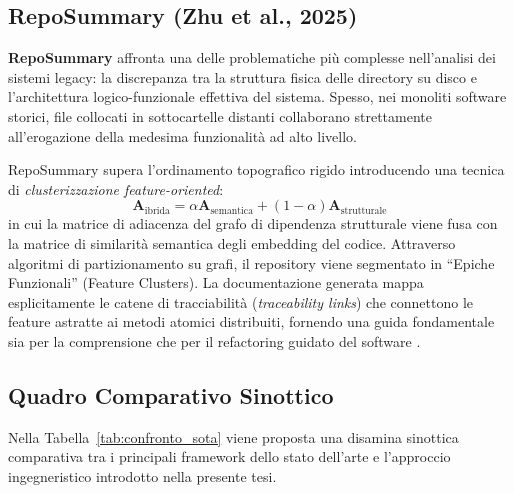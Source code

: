 \subsection{RepoSummary (Zhu et al., 2025)}
\label{subsec:reposummary}
\textbf{RepoSummary} \cite{zhu_reposummary_2025} affronta una delle problematiche più complesse nell'analisi dei sistemi legacy: la discrepanza tra la struttura fisica delle directory su disco e l'architettura logico-funzionale effettiva del sistema. Spesso, nei monoliti software storici, file collocati in sottocartelle distanti collaborano strettamente all'erogazione della medesima funzionalità ad alto livello.

RepoSummary supera l'ordinamento topografico rigido introducendo una tecnica di \emph{clusterizzazione feature-oriented}:
\begin{equation}
    \mathbf{A}_{\mathrm{ibrida}} = \alpha \mathbf{A}_{\mathrm{semantica}} + (1 - \alpha) \mathbf{A}_{\mathrm{strutturale}}
    \label{eq:reposummary_hybrid}
\end{equation}
in cui la matrice di adiacenza del grafo di dipendenza strutturale viene fusa con la matrice di similarità semantica degli embedding del codice. Attraverso algoritmi di partizionamento su grafi, il repository viene segmentato in ``Epiche Funzionali'' (Feature Clusters). La documentazione generata mappa esplicitamente le catene di tracciabilità (\emph{traceability links}) che connettono le feature astratte ai metodi atomici distribuiti, fornendo una guida fondamentale sia per la comprensione che per il refactoring guidato del software \cite{cordeiro_empirical_2024,pomian_together_2024}.

\subsection{Quadro Comparativo Sinottico}
\label{subsec:tabella_comparativa}

Nella Tabella~\ref{tab:confronto_sota} viene proposta una disamina sinottica comparativa tra i principali framework dello stato dell'arte e l'approccio ingegneristico introdotto nella presente tesi.


